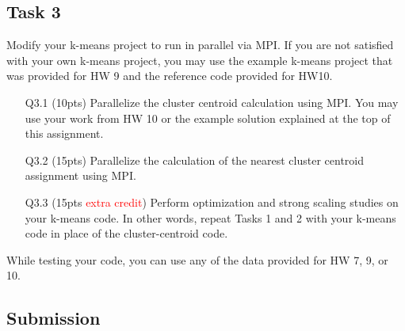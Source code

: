 \subsection*{Task 3}
Modify your k-means project to run in parallel via MPI.
If you are not satisfied with your own k-means project,
you may use the example k-means project that was provided for HW 9 and the reference code provided for HW10.
\begin{itemize}
    \item[Q3.1] (10pts) Parallelize the cluster centroid calculation using MPI.
    You may use your work from HW 10 or the example solution explained at the top of this assignment.
    \item[Q3.2] (15pts) Parallelize the calculation of the nearest cluster centroid assignment using MPI.
    \item[Q3.3] (15pts \textcolor{red}{extra credit}) Perform optimization and strong scaling studies on your k-means code.
    In other words, repeat Tasks 1 and 2 with your k-means code in place of the cluster-centroid code.
\end{itemize}
While testing your code, you can use any of the data provided for HW 7, 9, or 10.

\subsection*{Submission}

